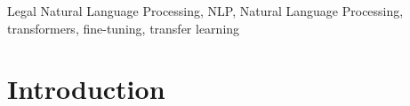 \documentclass[onecolumn, journal, english, 12pt, a4paper]{IEEEtran} %
\newcommand{\printnombrecomision}{Comisión Especial de Estadística de
  Seguridad, Justicia, Crimen y Transparencia}
\theoremstyle{definition}
\begin{document}
\begin{abstract}
    
\end{abstract}

\begin{IEEEkeywords}


Legal Natural Language Processing, NLP, Natural Language Processing, transformers, fine-tuning, transfer learning
\end{IEEEkeywords}






%
\IEEEpeerreviewmaketitle



\section{Introduction}
% 
% 
% 
% 
\end{document}
